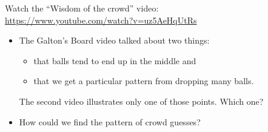 Watch the ``Wisdom of the crowd'' video:\\
\url{https://www.youtube.com/watch?v=uz5AeHqUtRs }

\begin{itemize}
\item The Galton's Board video talked about two things:
  \begin{itemize}
  \item         that balls tend to end up in the middle and
  \item         that we get a particular pattern from dropping many balls.
  \end{itemize}
The second video illustrates only one of those points.  Which one? \vspace{1cm}

\item How could we find the pattern of crowd guesses?\vspace{2cm}
\end{itemize}


